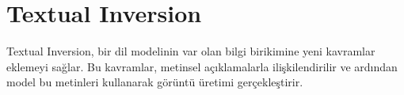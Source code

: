 \section{Textual Inversion}

Textual Inversion, bir dil modelinin var olan bilgi birikimine yeni kavramlar eklemeyi sağlar. Bu kavramlar, metinsel açıklamalarla ilişkilendirilir ve ardından model bu metinleri kullanarak görüntü üretimi gerçekleştirir.

\newpage